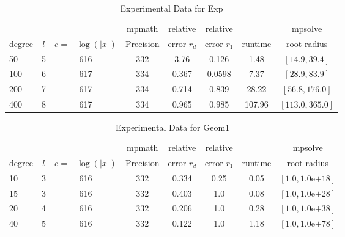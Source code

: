 \documentclass[sigconf]{acmart}
\begin{document}
\begin{table}[t]
\caption{Experimental Data for Exp}
\label{tab:exp}
\vskip -0.15in
\begin{center}
\begin{small}
\begin{sc}
\begin{tabular}{lccccccc}
\toprule
&  &  & mpmath & relative  & relative &  & mpsolve \\
degree  & $l$& $e=-\log(|x|)$& Precision &error $r_d$       & error $r_1$ &runtime& root radius\\
\midrule
 50 & 5 & 616 & 332 & 3.76 & 0.126 & 1.48 & $[14.9, 39.4]$\\
100 & 6 & 617 & 334 & 0.367 & 0.0598 & 7.37 & $[28.9, 83.9]$\\
 200 & 7 & 617 & 334 & 0.714 & 0.839 & 28.22 & $[56.8, 176.0]$\\
 400 & 8 & 617 & 334 & 0.965 & 0.985 & 107.96 & $[113.0, 365.0]$\\
\bottomrule
\end{tabular}
\end{sc}
\end{small}
\end{center}
\vskip 0.05in
\end{table}

\begin{table}[t]
\caption{Experimental Data for Geom1}
\label{tab:geom1}
\vskip -0.15in
\begin{center}
\begin{small}
\begin{sc}
\begin{tabular}{lccccccc}
\toprule
&  &  & mpmath & relative  & relative &  & mpsolve \\
degree  & $l$& $e=-\log(|x|)$& Precision &error $r_d$       & error $r_1$ &runtime& root radius\\
\midrule
 10 & 3 & 616 & 332 & 0.334 & 0.25 & 0.05 & $[1.0, 1.0\text{e+}18]$\\
 15 & 3 & 616 & 332 & 0.403 & 1.0 & 0.08 & $[1.0, 1.0\text{e+}28]$\\
 20 & 4 & 616 & 332 & 0.206 & 1.0 & 0.28 & $[1.0, 1.0\text{e+}38]$\\
 40 & 5 & 616 & 332 & 0.122 & 1.0 & 1.18 & $[1.0, 1.0\text{e+}78]$\\
\bottomrule
\end{tabular}
\end{sc}
\end{small}
\end{center}
\vskip 0.05in
\end{table}
\end{document}
